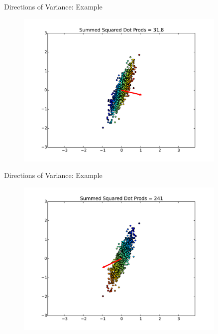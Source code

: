 \documentclass{beamer}
\begin{document}
\begin{frame}{Directions of Variance: Example}

\begin{figure}[t]
    \centering
	\includegraphics[width=0.9\textwidth]{2DPCADir0.pdf}
\end{figure}

\end{frame}

\begin{frame}{Directions of Variance: Example}

\begin{figure}[t]
    \centering
	\includegraphics[width=0.9\textwidth]{2DPCADir1.pdf}
\end{figure}

\end{frame}
\end{document}
